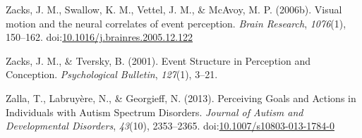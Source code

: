 \documentclass[
  english,
  man,floatsintext]{apa6}
\newlength{\cslhangindent}
\newenvironment{cslreferences}%
  {\setlength{\parindent}{0pt}%
  \everypar{\setlength{\hangindent}{\cslhangindent}}\ignorespaces}%
  {\par}
\begin{document}
\begin{cslreferences}
\leavevmode\hypertarget{ref-zacks_2006b}{}%
Zacks, J. M., Swallow, K. M., Vettel, J. M., \& McAvoy, M. P. (2006b). Visual motion and the neural correlates of event perception. \emph{Brain Research}, \emph{1076}(1), 150--162. doi:\href{https://doi.org/10.1016/j.brainres.2005.12.122}{10.1016/j.brainres.2005.12.122}

\leavevmode\hypertarget{ref-zacks_tversky_2001}{}%
Zacks, J. M., \& Tversky, B. (2001). Event Structure in Perception and Conception. \emph{Psychological Bulletin}, \emph{127}(1), 3--21.

\leavevmode\hypertarget{ref-zalla_2013}{}%
Zalla, T., Labruyère, N., \& Georgieff, N. (2013). Perceiving Goals and Actions in Individuals with Autism Spectrum Disorders. \emph{Journal of Autism and Developmental Disorders}, \emph{43}(10), 2353--2365. doi:\href{https://doi.org/10.1007/s10803-013-1784-0}{10.1007/s10803-013-1784-0}
\end{cslreferences}

\endgroup
\end{document}
